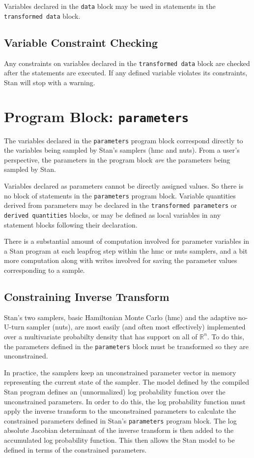 \documentclass[10pt]{report}
\newcommand{\Stan}{Stan\xspace}
\newcommand{\acronym}[1]{{\sc #1}\xspace}
\newcommand{\HMC}{\acronym{hmc}}
\newcommand{\NUTS}{\acronym{nuts}}
\newcommand{\code}[1]{{\tt #1}}
\newcommand{\reals}{\mathbb{R}}
\begin{document}
Variables declared in the \code{data} block may be used in statements
in the \code{transformed data} block.

\subsection{Variable Constraint Checking}

Any constraints on variables declared in the \code{transformed data}
block are checked after the statements are executed.  If any defined
variable violates its constraints, \Stan will stop with a warning.


\section{Program Block: \code{parameters}}

The variables declared in the \code{parameters} program block
correspond directly to the variables being sampled by \Stan's samplers
(\HMC and \NUTS).  From a user's perspective, the parameters in the
program block \emph{are} the parameters being sampled by \Stan.  

Variables declared as parameters cannot be directly assigned values.
So there is no block of statements in the \code{parameters} program
block.  Variable quantities derived from parameters may be declared in
the \code{transformed parameters} or \code{derived quantities} blocks,
or may be defined as local variables in any statement blocks following
their declaration.

There is a substantial amount of computation involved for parameter
variables in a \Stan program at each leapfrog step within the
\HMC or \NUTS samplers, and a bit more computation along with writes
involved for saving the parameter values corresponding to a sample.

\subsection{Constraining Inverse Transform}

Stan's two samplers, basic Hamiltonian Monte Carlo (\HMC) and the
adaptive no-U-turn sampler (\NUTS), are most easily (and often most
effectively) implemented over a multivariate probabilty density that
has support on all of $\reals^n$.  To do this, the parameters
defined in the \code{parameters} block must be transformed so they are
unconstrained. 

In practice, the samplers keep an unconstrained parameter vector in
memory representing the current state of the sampler.  The model
defined by the compiled \Stan program defines an (unnormalized) log
probability function over the unconstrained parameters.  In order to
do this, the log probability function must apply the inverse transform
to the unconstrained parameters to calculate the constrained
parameters defined in \Stan's \code{parameters} program block.  The
log absolute Jacobian determinant of the inverse transform is then
added to the accumulated log probability function.  This then allows
the \Stan model to be defined in terms of the constrained parameters.
\end{document}
